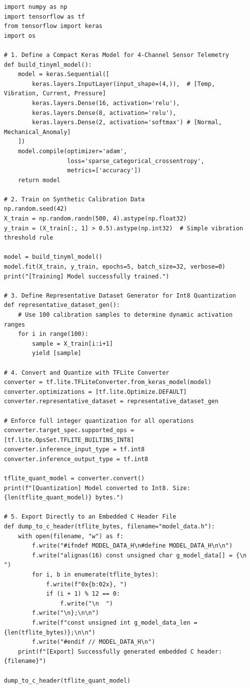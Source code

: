 \begin{lstlisting}[style=pythonstyle, caption={Complete Python pipeline to train, quantize, and export an embedded model.}, label={lst:tflite_conversion}]
import numpy as np
import tensorflow as tf
from tensorflow import keras
import os

# 1. Define a Compact Keras Model for 4-Channel Sensor Telemetry
def build_tinyml_model():
    model = keras.Sequential([
        keras.layers.InputLayer(input_shape=(4,)),  # [Temp, Vibration, Current, Pressure]
        keras.layers.Dense(16, activation='relu'),
        keras.layers.Dense(8, activation='relu'),
        keras.layers.Dense(2, activation='softmax') # [Normal, Mechanical_Anomaly]
    ])
    model.compile(optimizer='adam', 
                  loss='sparse_categorical_crossentropy', 
                  metrics=['accuracy'])
    return model

# 2. Train on Synthetic Calibration Data
np.random.seed(42)
X_train = np.random.randn(500, 4).astype(np.float32)
y_train = (X_train[:, 1] > 0.5).astype(np.int32)  # Simple vibration threshold rule

model = build_tinyml_model()
model.fit(X_train, y_train, epochs=5, batch_size=32, verbose=0)
print("[Training] Model successfully trained.")

# 3. Define Representative Dataset Generator for Int8 Quantization
def representative_dataset_gen():
    # Use 100 calibration samples to determine dynamic activation ranges
    for i in range(100):
        sample = X_train[i:i+1]
        yield [sample]

# 4. Convert and Quantize with TFLite Converter
converter = tf.lite.TFLiteConverter.from_keras_model(model)
converter.optimizations = [tf.lite.Optimize.DEFAULT]
converter.representative_dataset = representative_dataset_gen

# Enforce full integer quantization for all operations
converter.target_spec.supported_ops = [tf.lite.OpsSet.TFLITE_BUILTINS_INT8]
converter.inference_input_type = tf.int8
converter.inference_output_type = tf.int8

tflite_quant_model = converter.convert()
print(f"[Quantization] Model converted to Int8. Size: {len(tflite_quant_model)} bytes.")

# 5. Export Directly to an Embedded C Header File
def dump_to_c_header(tflite_bytes, filename="model_data.h"):
    with open(filename, "w") as f:
        f.write("#ifndef MODEL_DATA_H\n#define MODEL_DATA_H\n\n")
        f.write("alignas(16) const unsigned char g_model_data[] = {\n  ")
        for i, b in enumerate(tflite_bytes):
            f.write(f"0x{b:02x}, ")
            if (i + 1) % 12 == 0:
                f.write("\n  ")
        f.write("\n};\n\n")
        f.write(f"const unsigned int g_model_data_len = {len(tflite_bytes)};\n\n")
        f.write("#endif // MODEL_DATA_H\n")
    print(f"[Export] Successfully generated embedded C header: {filename}")

dump_to_c_header(tflite_quant_model)
\end{lstlisting}

